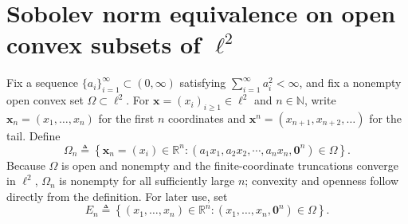 \documentclass[12pt]{article}
\theoremstyle{plain}
\theoremstyle{definition}
\theoremstyle{remark}
\numberwithin{equation}{section}
\newcommand{\nn}{\mathbb{N}}
\begin{document}
\section{Sobolev norm equivalence on open convex subsets of \texorpdfstring{$\ell^{2}$}{l2}}
Fix a sequence $\{a_i\}_{i=1}^\infty\subset(0,\infty)$ satisfying $\sum_{i=1}^\infty a_i^2<\infty$, and fix a nonempty open convex set $\Omega\subset\ell^2$.  For $\mathbf x=(x_i)_{i\geqslant1}\in\ell^2$ and $n\in\nn$, write $\mathbf x_n=(x_1,\ldots,x_n)$ for the first $n$ coordinates and $\mathbf x^n=(x_{n+1},x_{n+2},\ldots)$ for the tail.  Define
$$\Omega_{n} \triangleq \left\{ \textbf{x}_{n} =\left( x_{i} \right) \in \mathbb{R}^{n} :\left( a_{1}x_{1},a_{2}x_{2},\cdots ,a_{n}x_{n},\textbf{0}^{n} \right) \in \Omega \right\} .$$
Because $\Omega$ is open and nonempty and the finite-coordinate truncations converge in $\ell^2$, $\Omega_n$ is nonempty for all sufficiently large $n$; convexity and openness follow directly from the definition. 
For later use, set
$$
E_n\triangleq\left\{(x_1,\ldots,x_n)\in\mathbb{R}^n:
(x_1,\ldots,x_n,\mathbf 0^n)\in\Omega\right\}.
$$
\end{document}
